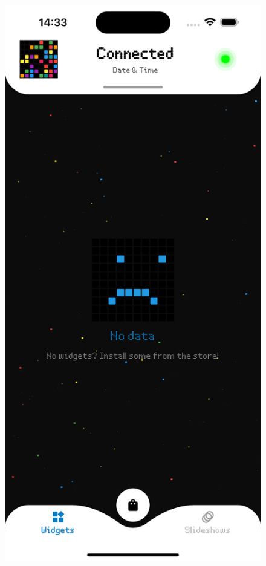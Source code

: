 \begin{figure}[h]
    \centering
    \begin{minipage}[b]{0.32\textwidth}
        \centering
        \includegraphics[width=\textwidth]{tesi/img/client_demo/installed_widgets/no_data.png}

\end{minipage}
\end{figure}
